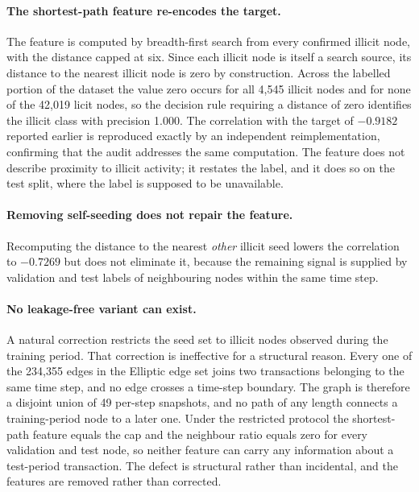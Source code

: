 \documentclass[12pt,a4paper]{article}
\begin{document}
\paragraph{The shortest-path feature re-encodes the target.}
The feature is computed by breadth-first search from every
confirmed illicit node, with the distance capped at six. Since
each illicit node is itself a search source, its distance to the
nearest illicit node is zero by construction. Across the labelled
portion of the dataset the value zero occurs for all 4{,}545
illicit nodes and for none of the 42{,}019 licit nodes, so the
decision rule requiring a distance of zero identifies the illicit
class with precision 1.000. The correlation with the target of
$-0.9182$ reported earlier is reproduced exactly by an
independent reimplementation, confirming that the audit addresses
the same computation. The feature does not describe proximity to
illicit activity; it restates the label, and it does so on the
test split, where the label is supposed to be unavailable.

\paragraph{Removing self-seeding does not repair the feature.}
Recomputing the distance to the nearest \emph{other} illicit seed
lowers the correlation to $-0.7269$ but does not eliminate it,
because the remaining signal is supplied by validation and test
labels of neighbouring nodes within the same time step.

\paragraph{No leakage-free variant can exist.}
A natural correction restricts the seed set to illicit nodes
observed during the training period. That correction is
ineffective for a structural reason. Every one of the 234{,}355
edges in the Elliptic edge set joins two transactions belonging
to the same time step, and no edge crosses a time-step boundary.
The graph is therefore a disjoint union of 49 per-step snapshots,
and no path of any length connects a training-period node to a
later one. Under the restricted protocol the shortest-path
feature equals the cap and the neighbour ratio equals zero for
every validation and test node, so neither feature can carry any
information about a test-period transaction. The defect is
structural rather than incidental, and the features are removed
rather than corrected.
\end{document}
